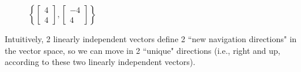 \documentclass[titlepage, a4paper, 10pt]{article}
\begin{document}
\begin{enumerate}
\begin{figure}[!h]
	\centering
	\caption{\(\left\{\begin{bmatrix}4 \\ 4\end{bmatrix}, \begin{bmatrix}-4 \\ 4\end{bmatrix}\right\}\)}
	\end{figure}

Intuitively, 2 linearly independent vectors define 2 ``new navigation directions" in the vector space, so we can move in 2 ``unique" directions (i.e., right and up, 
according to these two linearly independent vectors).
\end{enumerate}
\end{document}

